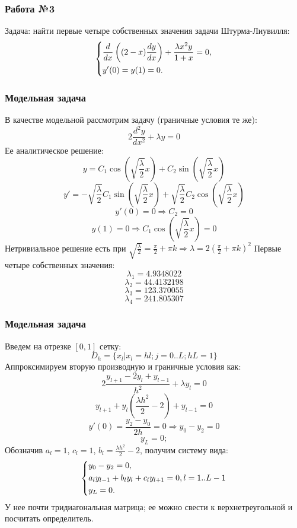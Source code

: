 \documentclass[11pt]{article}
\begin{document}
\subsubsection*{Работа №3}
 Задача: найти первые четыре собственных значения задачи Штурма-Лиувилля:
 \[
  \begin{dcases} 
   \frac{d}{dx}\left((2-x)\frac{dy}{dx}\right) + \frac{\lambda x^2 y}{1 + x} = 0, \\
   y'(0) = y(1) = 0.
  \end{dcases}
\]
\subsubsection*{Модельная задача}
В качестве модельной рассмотрим задачу (граничные условия те же):
\[
 2\frac{d^2y}{dx^2} + \lambda y = 0
\]
Ее аналитическое решение:
\[
 y = C_1 \cos\left(\sqrt{\frac{\lambda}{2}}x\right) + C_2\sin\left(\sqrt{\frac{\lambda}{2}}x\right)
\]
\[
 y' = -\sqrt{\frac{\lambda}{2}}C_1 \sin\left(\sqrt{\frac{\lambda}{2}}x\right) + \sqrt{\frac{\lambda}{2}}C_2 \cos\left(\sqrt{\frac{\lambda}{2}}x\right)
\]
\[
 y'(0) = 0 \Rightarrow C_2 = 0
\]
\[
 y(1) = 0 \Rightarrow C_1 \cos\left(\sqrt{\frac{\lambda}{2}}x\right) = 0
\]
Нетривиальное решение есть при $\sqrt{\frac{\lambda}{2}} = \frac{\pi}{2} + \pi k \Rightarrow \lambda = 2\left(\frac{\pi}{2} + \pi k\right)^2$
Первые четыре собственных значения:
\[
 \lambda_1 = 4.9348022 
 \]
 \[
 \lambda_2 = 44.4132198 
 \]
 \[
 \lambda_3 = 123.370055 
 \]
 \[
 \lambda_4 = 241.805307
\]

\subsubsection*{Модельная задача}
Введем на отрезке $[0, 1]$ сетку:
\[
 D_h = \{ x_l | x_l = hl; j=0..L; hL = 1\}
\]
Аппроксимируем вторую производную и граничные условия как:
\[
 2 \frac{y_{l + 1} - 2y_l + y_{l - 1}}{h^2} + \lambda y_l = 0
\]
\[
 y_{l+1} + y_l\left(\frac{\lambda h^2}{2} - 2\right) + y_{l-1} = 0
\]
\[
 y'(0) = \frac{y_2 - y_0}{2h} = 0 \Rightarrow y_0 - y_2 = 0
\]
\[
 y_L = 0;
\]
Обозначив $a_l = 1$, $c_l = 1$, $b_l = \frac{\lambda h^2}{2} - 2$, получим систему вида:
\[
  \begin{dcases} 
  y_0 - y_2 = 0, \\
   a_l y_{l-1} + b_l y_l + c_l y_{l+1} = 0, l=1..L-1 \\
   y_L = 0.
  \end{dcases}
\]
У нее почти тридиагональная матрица; ее можно свести к верхнетреугольной и посчитать определитель.
\end{document}
